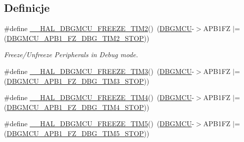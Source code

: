 \subsection*{Definicje}
\begin{DoxyCompactItemize}
\item 
\#define \hyperlink{group___h_a_l___exported___macros_ga4a466905a367266e7c23417248dc741d}{\+\_\+\+\_\+\+H\+A\+L\+\_\+\+D\+B\+G\+M\+C\+U\+\_\+\+F\+R\+E\+E\+Z\+E\+\_\+\+T\+I\+M2}()~(\hyperlink{group___peripheral__declaration_ga92ec6d9ec2251fda7d4ce09748cd74b4}{D\+B\+G\+M\+CU}-\/$>$A\+P\+B1\+FZ $\vert$= (\hyperlink{group___peripheral___registers___bits___definition_gaae3c5b87084934a18748f5ec168f5aef}{D\+B\+G\+M\+C\+U\+\_\+\+A\+P\+B1\+\_\+\+F\+Z\+\_\+\+D\+B\+G\+\_\+\+T\+I\+M2\+\_\+\+S\+T\+OP}))
\begin{DoxyCompactList}\small\item\em Freeze/\+Unfreeze Peripherals in Debug mode. \end{DoxyCompactList}\item 
\#define \hyperlink{group___h_a_l___exported___macros_gaf2fe2b6d0a5e8df4ebb38020acf210d9}{\+\_\+\+\_\+\+H\+A\+L\+\_\+\+D\+B\+G\+M\+C\+U\+\_\+\+F\+R\+E\+E\+Z\+E\+\_\+\+T\+I\+M3}()~(\hyperlink{group___peripheral__declaration_ga92ec6d9ec2251fda7d4ce09748cd74b4}{D\+B\+G\+M\+CU}-\/$>$A\+P\+B1\+FZ $\vert$= (\hyperlink{group___peripheral___registers___bits___definition_ga2fea6834f4ef9fc6b403cd079a001cec}{D\+B\+G\+M\+C\+U\+\_\+\+A\+P\+B1\+\_\+\+F\+Z\+\_\+\+D\+B\+G\+\_\+\+T\+I\+M3\+\_\+\+S\+T\+OP}))
\item 
\#define \hyperlink{group___h_a_l___exported___macros_ga9ec45e12bbea210d8ec91d9cdd9f911c}{\+\_\+\+\_\+\+H\+A\+L\+\_\+\+D\+B\+G\+M\+C\+U\+\_\+\+F\+R\+E\+E\+Z\+E\+\_\+\+T\+I\+M4}()~(\hyperlink{group___peripheral__declaration_ga92ec6d9ec2251fda7d4ce09748cd74b4}{D\+B\+G\+M\+CU}-\/$>$A\+P\+B1\+FZ $\vert$= (\hyperlink{group___peripheral___registers___bits___definition_ga7ac65bf9342bb8acbcb25938e93abc45}{D\+B\+G\+M\+C\+U\+\_\+\+A\+P\+B1\+\_\+\+F\+Z\+\_\+\+D\+B\+G\+\_\+\+T\+I\+M4\+\_\+\+S\+T\+OP}))
\item 
\#define \hyperlink{group___h_a_l___exported___macros_ga051eca105d8696d54e19fdfc8343a0a2}{\+\_\+\+\_\+\+H\+A\+L\+\_\+\+D\+B\+G\+M\+C\+U\+\_\+\+F\+R\+E\+E\+Z\+E\+\_\+\+T\+I\+M5}()~(\hyperlink{group___peripheral__declaration_ga92ec6d9ec2251fda7d4ce09748cd74b4}{D\+B\+G\+M\+CU}-\/$>$A\+P\+B1\+FZ $\vert$= (\hyperlink{group___peripheral___registers___bits___definition_ga42d29d40515d36ce6ed7e5d34ed17dcf}{D\+B\+G\+M\+C\+U\+\_\+\+A\+P\+B1\+\_\+\+F\+Z\+\_\+\+D\+B\+G\+\_\+\+T\+I\+M5\+\_\+\+S\+T\+OP}))

\end{DoxyCompactItemize}
